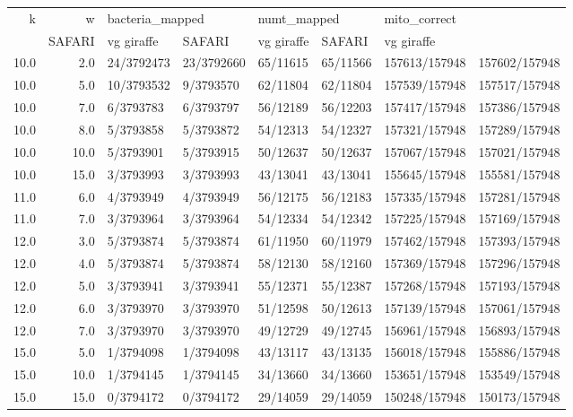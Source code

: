 \begin{tabular}{rrllllll}
\toprule
   k &    w & \multicolumn{2}{l}{bacteria\_mapped} & \multicolumn{2}{l}{numt\_mapped} & \multicolumn{2}{l}{mito\_correct} \\
     &          SAFARI & vg giraffe &      SAFARI & vg giraffe &        SAFARI &    vg giraffe \\
\midrule
10.0 &  2.0 &      24/3792473 & 23/3792660 &    65/11615 &   65/11566 & 157613/157948 & 157602/157948 \\
10.0 &  5.0 &      10/3793532 &  9/3793570 &    62/11804 &   62/11804 & 157539/157948 & 157517/157948 \\
10.0 &  7.0 &       6/3793783 &  6/3793797 &    56/12189 &   56/12203 & 157417/157948 & 157386/157948 \\
10.0 &  8.0 &       5/3793858 &  5/3793872 &    54/12313 &   54/12327 & 157321/157948 & 157289/157948 \\
10.0 & 10.0 &       5/3793901 &  5/3793915 &    50/12637 &   50/12637 & 157067/157948 & 157021/157948 \\
10.0 & 15.0 &       3/3793993 &  3/3793993 &    43/13041 &   43/13041 & 155645/157948 & 155581/157948 \\
11.0 &  6.0 &       4/3793949 &  4/3793949 &    56/12175 &   56/12183 & 157335/157948 & 157281/157948 \\
11.0 &  7.0 &       3/3793964 &  3/3793964 &    54/12334 &   54/12342 & 157225/157948 & 157169/157948 \\
12.0 &  3.0 &       5/3793874 &  5/3793874 &    61/11950 &   60/11979 & 157462/157948 & 157393/157948 \\
12.0 &  4.0 &       5/3793874 &  5/3793874 &    58/12130 &   58/12160 & 157369/157948 & 157296/157948 \\
12.0 &  5.0 &       3/3793941 &  3/3793941 &    55/12371 &   55/12387 & 157268/157948 & 157193/157948 \\
12.0 &  6.0 &       3/3793970 &  3/3793970 &    51/12598 &   50/12613 & 157139/157948 & 157061/157948 \\
12.0 &  7.0 &       3/3793970 &  3/3793970 &    49/12729 &   49/12745 & 156961/157948 & 156893/157948 \\
15.0 &  5.0 &       1/3794098 &  1/3794098 &    43/13117 &   43/13135 & 156018/157948 & 155886/157948 \\
15.0 & 10.0 &       1/3794145 &  1/3794145 &    34/13660 &   34/13660 & 153651/157948 & 153549/157948 \\
15.0 & 15.0 &       0/3794172 &  0/3794172 &    29/14059 &   29/14059 & 150248/157948 & 150173/157948 \\

\end{tabular}
